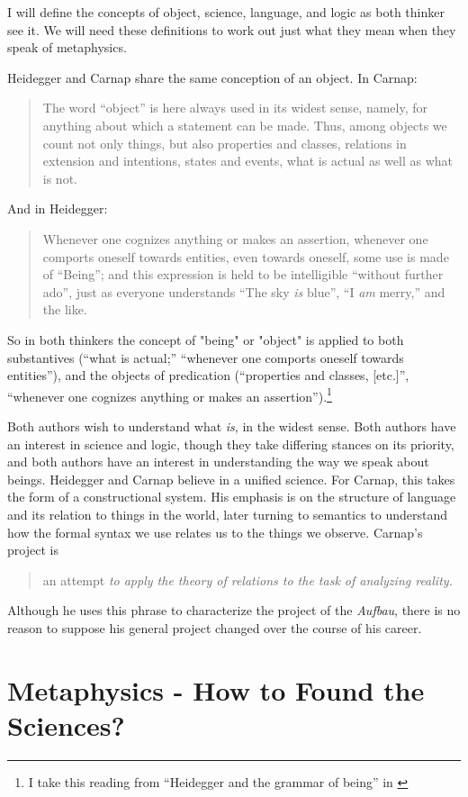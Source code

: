 \documentclass[leqno, 12pt]{turabian-researchpaper}
\begin{document}
	I will define the concepts of object, science, language, and logic as both thinker
	see it. We will need these definitions to work out just what they mean when
	they speak of metaphysics.

	Heidegger and Carnap share the same conception of an object. In Carnap:
	\blockquote[{\cite[5]{carnap2003}}]{The word \enquote{object} is here always used in its widest sense, namely, for anything about which a statement can be made. Thus, among objects we count not only things, but also properties and classes, relations in extension and intentions, states and events, what is actual as well as what is not.}
	And in Heidegger: \blockquote[{\cite[5]{heidegger2008b}}]{Whenever one cognizes anything or makes an assertion, whenever one comports oneself towards entities, even towards oneself, some use is made of \enquote{Being}; and this expression is held to be intelligible \enquote{without further ado}, just as everyone understands \enquote{The sky \emph{is} blue}, \enquote{I \emph{am} merry,} and the like.}
	So in both thinkers the concept of "being" or "object" is applied to both substantives
	(\enquote{what is actual;} \enquote{whenever one comports oneself towards entities}),
	and the objects of predication (\enquote{properties and classes, [etc.]}, \enquote{whenever one cognizes anything or makes an assertion}).\footnote{I
	take this reading from \enquote{Heidegger and the grammar of being} in \cite[chap.
	15]{priest2002}}

	Both authors wish to understand what \emph{is}, in the widest sense. Both authors
	have an interest in science and logic, though they take differing stances on
	its priority, and both authors have an interest in understanding the way we speak
	about beings. Heidegger and Carnap believe in a unified science. For Carnap,
	this takes the form of a constructional system. His emphasis is on the structure
	of language and its relation to things in the world, later turning to
	semantics to understand how the formal syntax we use relates us to the things
	we observe. Carnap's project is \blockquote[{\cite[7]{carnap2003}}]{an attempt \emph{to apply the theory of relations to the task of analyzing reality.}}
	Although he uses this phrase to characterize the project of the \textit{Aufbau},
	there is no reason to suppose his general project changed over the course of his
	career.

	\section{Metaphysics - How to Found the Sciences?}
\end{document}
